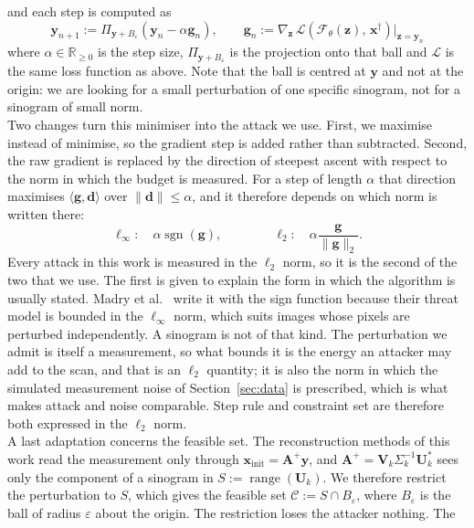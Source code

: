 \documentclass{article}
\numberwithin{equation}{section}
\begin{document}
and each step is computed as
\[\mathbf{y}_{n+1}:=\Pi_{\mathbf{y}+B_\varepsilon}\left( \mathbf{y}_n-\alpha\mathbf{g}_n\right), \qquad \mathbf{g}_n:=\nabla_\mathbf{z}\, \mathcal{L}\!\left(\mathcal{F}_\theta(\mathbf{z}),\,\mathbf{x}^\dagger\right)   \Big|_{\mathbf{z}=\mathbf{y}_n}\]
where $\alpha\in\mathbb{R}_{\geq0}$ is the step size, $\Pi_{\mathbf{y}+B_\varepsilon}$ is the
projection onto that ball and $\mathcal{L}$ is the same loss function as above. Note that
the ball is centred at $\mathbf{y}$ and not at the origin: we are looking for a small
perturbation of one specific sinogram, not for a sinogram of small norm.\\
Two changes turn this minimiser into the attack we use. First, we maximise instead of
minimise, so the gradient step is added rather than subtracted. Second, the raw gradient is
replaced by the direction of steepest ascent with respect to the norm in which the budget is
measured. For a step of length $\alpha$ that direction maximises
$\langle\mathbf{g},\mathbf{d}\rangle$ over $\lVert\mathbf{d}\rVert\leq\alpha$, and it therefore
depends on which norm is written there:
\[\ell_\infty:\quad \alpha\operatorname{sgn}(\mathbf{g}),\qquad\qquad
  \ell_2:\quad \alpha\frac{\mathbf{g}}{\lVert\mathbf{g}\rVert_2}.\]
Every attack in this work is measured in the $\ell_2$ norm, so it is the second of the two that
we use. The first is given to explain the form in which the algorithm is usually stated.
Madry et al.~\parencite{PGD} write it with the sign function because their threat model is
bounded in the $\ell_\infty$ norm, which suits images whose pixels are perturbed independently.
A sinogram is not of that kind. The perturbation we admit is itself a measurement, so what
bounds it is the energy an attacker may add to the scan, and that is an $\ell_2$ quantity; it is
also the norm in which the simulated measurement noise of Section~\ref{sec:data} is prescribed,
which is what makes attack and noise comparable. Step rule and constraint set are
therefore both expressed in the $\ell_2$ norm.\\
A last adaptation concerns the feasible set. The reconstruction methods of this work read the
measurement only through $\mathbf{x}_\text{init}=\mathbf{A}^{+}\mathbf{y}$, and
$\mathbf{A}^{+}=\mathbf{V}_k\Sigma_k^{-1}\mathbf{U}_k^{*}$ sees only the component of a sinogram in
$S:=\operatorname{range}(\mathbf{U}_k)$. We therefore restrict the perturbation to $S$, which gives the
feasible set $\mathcal{C}:=S\cap B_\varepsilon$, where $B_\varepsilon$ is the ball of radius
$\varepsilon$ about the origin. The restriction loses the attacker nothing. The
\end{document}
